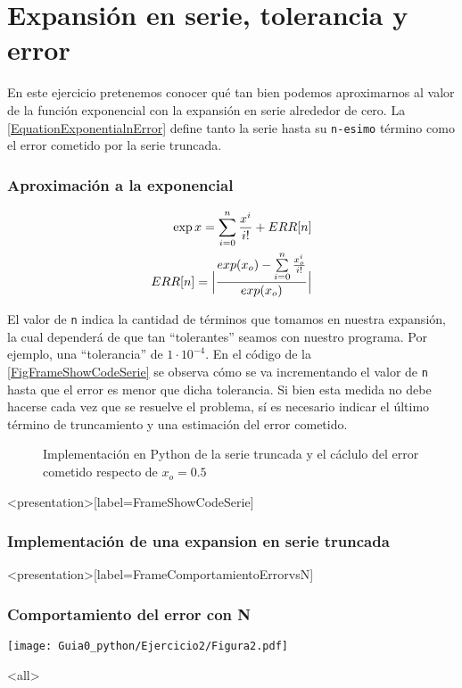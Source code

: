 \section{Expansión en serie, tolerancia y error}


En este ejercicio pretenemos conocer qué tan bien
podemos aproximarnos al valor de la función exponencial 
con la expansión en serie alrededor de cero.
La \autoref{EquationExponentialnError} define tanto la 
serie hasta su \texttt{n-esimo} término como el error
cometido por la serie truncada. 

\mode*

\begin{frame}[label=FrameEquationExponencial]
  \frametitle<presentation>{Aproximación a la exponencial}

  \begin{equation}\label{EquationExponentialnError}
    \begin{split}
      \exp{x} = \sum_{i=0} ^n \frac{x^i}{i!}+ ERR[n] \\
	ERR [ n ] = \Bigl \vert 
		\frac {exp(x_o) - \sum\limits_{i=0} ^n \frac{x_o^i}{i!} } { exp(x_o) } \Bigr \vert
    \end{split}
  \end{equation}

\end{frame}


El valor de \texttt{n} indica la cantidad de términos que tomamos en 
nuestra expansión, la cual dependerá de que tan ``tolerantes''
seamos con nuestro programa. Por ejemplo, una ``tolerancia'' 
de $1 \cdot 10^{-4} $. En el código de la \autoref{FigFrameShowCodeSerie} 
se observa cómo se va incrementando el valor de \texttt{n}
hasta que el error es menor que dicha tolerancia. Si bien esta 
medida no debe hacerse cada vez que se resuelve el problema, 
sí es necesario indicar el último término de truncamiento 
y una estimación del error cometido. 

\begin{figure}
  \caption{\protect\label{FigFrameShowCodeSerie}
  Implementación en Python de la serie truncada 
  y el cáclulo del error cometido respecto de 
  $x_o = 0.5 $}
\end{figure}
\mode*

\begin{frame}<presentation>[label=FrameShowCodeSerie]
  \frametitle{Implementación de una expansion en serie truncada}

   

\end{frame}

\begin{frame}<presentation>[label=FrameComportamientoErrorvsN]
  \frametitle{Comportamiento del error con N}
  \center
    \texttt{[image: Guia0\_python/Ejercicio2/Figura2.pdf]}

\end{frame}

\mode<all>
